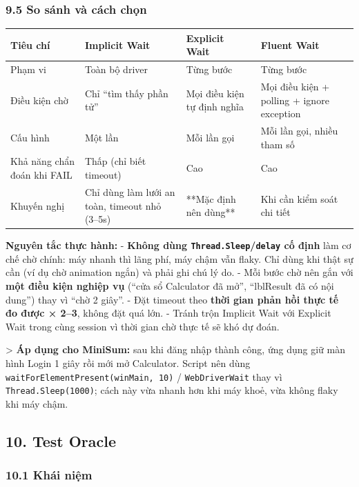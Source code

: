 \subsubsection{9.5 So sánh và cách chọn}

\begin{table}[H]
\centering
\begin{tabular}{|l|l|l|l|}
\hline
\textbf{Tiêu chí} & \textbf{Implicit Wait} & \textbf{Explicit Wait} & \textbf{Fluent Wait} \\ \hline
Phạm vi & Toàn bộ driver & Từng bước & Từng bước \\ \hline
Điều kiện chờ & Chỉ “tìm thấy phần tử” & Mọi điều kiện tự định nghĩa & Mọi điều kiện + polling + ignore exception \\ \hline
Cấu hình & Một lần & Mỗi lần gọi & Mỗi lần gọi, nhiều tham số \\ \hline
Khả năng chẩn đoán khi FAIL & Thấp (chỉ biết timeout) & Cao & Cao \\ \hline
Khuyến nghị & Chỉ dùng làm lưới an toàn, timeout nhỏ (3–5s) & **Mặc định nên dùng** & Khi cần kiểm soát chi tiết \\ \hline
\end{tabular}
\end{table}




\textbf{Nguyên tắc thực hành:}
- \textbf{Không dùng \texttt{Thread.Sleep}/\texttt{delay} cố định} làm cơ chế chờ chính: máy nhanh thì lãng phí, máy chậm vẫn flaky. Chỉ dùng khi thật sự cần (ví dụ chờ animation ngắn) và phải ghi chú lý do.
- Mỗi bước chờ nên gắn với \textbf{một điều kiện nghiệp vụ} (“cửa sổ Calculator đã mở”, “lblResult đã có nội dung”) thay vì “chờ 2 giây”.
- Đặt timeout theo \textbf{thời gian phản hồi thực tế đo được × 2–3}, không đặt quá lớn.
- Tránh trộn Implicit Wait với Explicit Wait trong cùng session vì thời gian chờ thực tế sẽ khó dự đoán.

> \textbf{Áp dụng cho MiniSum:} sau khi đăng nhập thành công, ứng dụng giữ màn hình Login 1 giây rồi mới mở Calculator. Script nên dùng \texttt{waitForElementPresent(winMain, 10)} / \texttt{WebDriverWait} thay vì \texttt{Thread.Sleep(1000)}; cách này vừa nhanh hơn khi máy khoẻ, vừa không flaky khi máy chậm.


\subsection{10. Test Oracle}

\subsubsection{10.1 Khái niệm}

